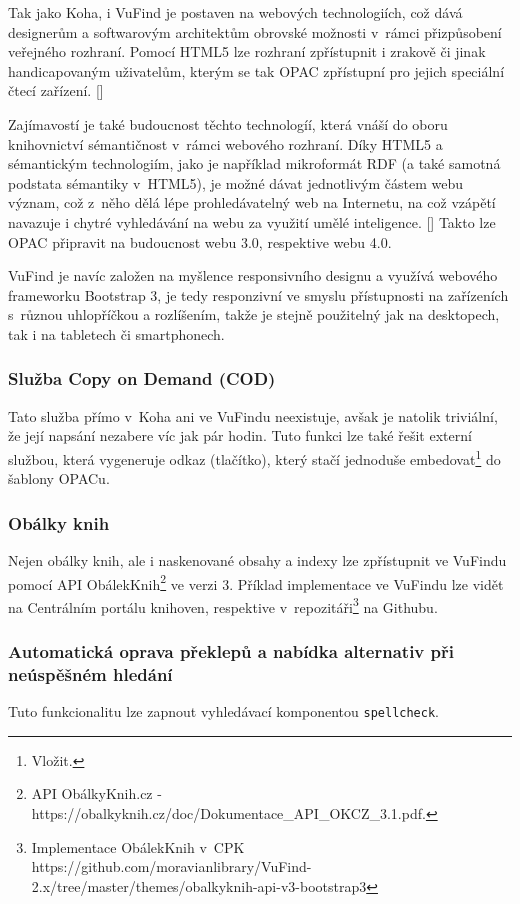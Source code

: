 \documentclass[
	11pt, oneside, printed, final, palatino, monochrome
	microtype,
	table,   %
	lof,     %
	lot     %
]{fithesis3}
\newcommand{\citepages}[2]{[\cite[#1]{#2}]}
\newcommand{\code}[1]{\texttt{#1}}
\begin{document}
{Tak jako Koha, i VuFind je postaven na webových technologiích, což dává designerům a softwarovým architektům obrovské možnosti v~rámci přizpůsobení veřejného rozhraní. Pomocí HTML5 lze rozhraní zpřístupnit i zrakově či jinak handicapovaným uživatelům, kterým se tak OPAC zpřístupní pro jejich speciální čtecí zařízení. \citepages{19-27}{Hogan2011}

Zajímavostí je také budoucnost těchto technologíí, která vnáší do oboru knihovnictví sémantičnost v~rámci webového rozhraní. Díky HTML5 a sémantickým technologiím, jako je například mikroformát RDF (a také samotná podstata sémantiky v~HTML5), je možné dávat jednotlivým částem webu význam, což z~něho dělá lépe prohledávatelný web na Internetu, na což vzápětí navazuje i chytré vyhledávání na webu za využití umělé inteligence. \citepages{70-77}{fay_sauers_2012} Takto lze OPAC připravit na budoucnost webu 3.0, respektive webu 4.0.

VuFind je navíc založen na myšlence responsivního designu a využívá webového frameworku  Bootstrap 3, je tedy responzivní ve smyslu přístupnosti na zařízeních s~různou uhlopříčkou a rozlíšením, takže je stejně použitelný jak na desktopech, tak i na tabletech či smartphonech.

\subsubsection{Služba Copy on Demand (COD)}
Tato služba přímo v~Koha ani ve VuFindu neexistuje, avšak je natolik triviální, že její napsání nezabere víc jak pár hodin. Tuto funkci lze také řešit externí službou, která vygeneruje odkaz (tlačítko), který stačí jednoduše embedovat\footnote{Vložit.} do šablony OPACu.


\subsubsection{Obálky knih}
Nejen obálky knih, ale i naskenované obsahy a indexy lze zpřístupnit ve VuFindu pomocí API ObálekKnih\footnote{API ObálkyKnih.cz - https://obalkyknih.cz/doc/Dokumentace\_API\_OKCZ\_3.1.pdf.} ve verzi 3. Příklad implementace ve VuFindu lze vidět na Centrálním portálu knihoven, respektive v~repozitáři\footnote{Implementace ObálekKnih v~CPK https://github.com/moravianlibrary/VuFind-2.x/tree/master/themes/obalkyknih-api-v3-bootstrap3} na Githubu.

\subsubsection{Automatická oprava překlepů a nabídka alternativ při neúspěšném hledání}
Tuto funkcionalitu lze zapnout vyhledávací komponentou \code{spellcheck}.

}
\end{document}
